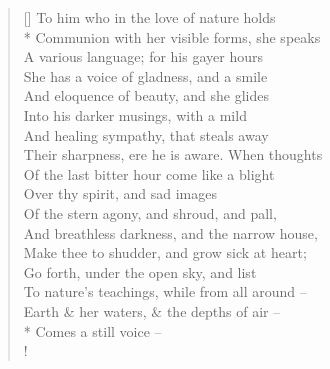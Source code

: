 \documentclass[MAIN]{subfiles}
\begin{document}
\settowidth{\versewidth}{Communion with her visible forms, she speaks}
\begin{verse}[\versewidth]
To him who in the love of nature holds\\*
Communion with her visible forms, she speaks\\
A various language; for his gayer hours\\
She has a voice of gladness, and a smile\\
And eloquence of beauty, and she glides\\
Into his darker musings, with a mild\\
And healing sympathy, that steals away\\
Their sharpness, ere he is aware. When thoughts\\
Of the last bitter hour come like a blight\\
Over thy spirit, and sad images\\
Of the stern agony, and shroud, and pall,\\
And breathless darkness, and the narrow house,\\
Make thee to shudder, and grow sick at heart;\\
Go forth, under the open sky, and list\\
To nature's teachings, while from all around --\\
Earth \& her waters, \& the depths of air --\\*
Comes a still voice --\\!


\end{verse}
\end{document}
